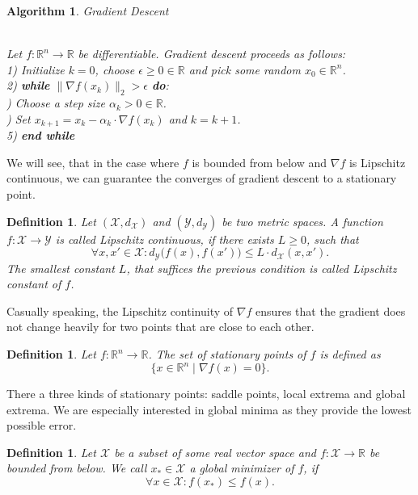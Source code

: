 \documentclass[11pt, a4paper]{article}
\newtheorem{definition}[theorem]{Definition}
\newtheorem{algorithm}[theorem]{Algorithm}
\newcommand{\R}{\mathds{R}}
\newcommand{\X}{\mathcal{X}}
\newcommand{\Y}{\mathcal{Y}}
\begin{document}
\begin{algorithm}
\caption{Gradient Descent} \ \\
Let $f: \R^n \to \R$ be differentiable. Gradient descent proceeds as follows: \\

1) Initialize $k=0$, choose $\epsilon \geq 0 \in \R$ and pick some random $x_0 \in \R^n$. \\

2) \textbf{while} $ \big \| \nabla f(x_k) \big \|_2 > \epsilon $ \textbf{do}:\\

) Choose a step size $\alpha_k > 0 \in \R$. \\

) Set $x_{k+1} = x_k - \alpha_k \cdot \nabla f(x_k)$ and $k = k+1$. \\

5) \textbf{end while} \\
\end {algorithm}

We will see, that in the case where $f$ is bounded from below and $\nabla f$ is Lipschitz continuous, we can guarantee the  converges of gradient descent to a stationary point.

\begin{definition}
Let $(\X,d_{\X})$ and $(\Y, d_{\Y})$ be two metric spaces. A function $f: \X \to \Y$ is called Lipschitz continuous, if there exists $L \geq 0$, such that
\[ \forall x,x' \in \X : d_{\Y} \big ( f(x) , f(x') \big ) \leq L \cdot d_{\X}(x,x'). \]
The smallest constant $L$, that suffices the previous condition is called Lipschitz constant of $f$.
\end{definition}

Casually speaking, the Lipschitz continuity of $\nabla f$ ensures that the gradient does not change heavily for two points that are close to each other.

\begin{definition}
Let $f: \R^n \to \R$. The set of stationary points of $f$ is defined as
\[ \big \{ x \in \R^n \mid \nabla f(x) = 0 \big \}. \]
\end{definition}

There a three kinds of stationary points: saddle points, local extrema and global extrema. We are especially interested in global minima as they provide the lowest possible error.

\begin{definition}
Let $\X$ be a subset of some real vector space and $f: \X \to \R$ be bounded from below. We call $x_* \in \X$ a global minimizer of $f$, if
\[ \forall x \in \X : f(x_*) \leq f(x). \]
\end{definition}
\end{document}

